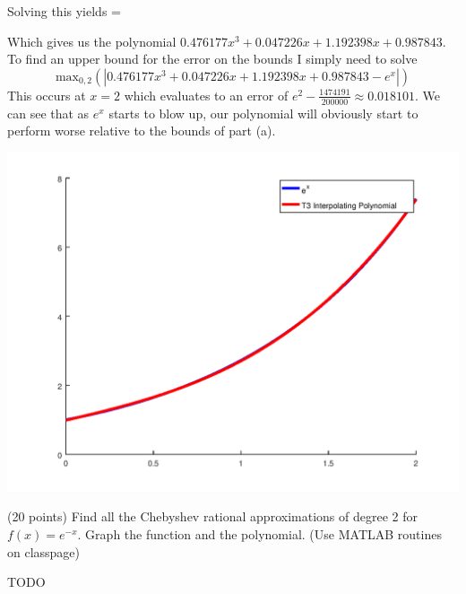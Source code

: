 \documentclass[10pt]{jhwhw}
\begin{document}
	\bigbreak
	Solving this yields
	\bigbreak
	\left[\begin{array}{c}
		a \\  b \\  c \\ d \\
	\end{array} \right] =
	\left[\begin{array}{c}
		0.476177 \\ 0.047226 \\ 1.192398 \\ 0.987843 \\
	\end{array} \right] \bigbreak

	\bigbreak
	Which gives us the polynomial $0.476177x^3 + 0.047226x + 1.192398x + 0.987843$.
	To find an upper bound for the error on the bounds I simply need to solve
	$$
		\text{max}_{0,2}(|0.476177x^3 + 0.047226x + 1.192398x + 0.987843 - e^x|)
	$$
	This occurs at $x=2$ which evaluates to an error of $e^2 - \frac{1474191}{200000} \approx 0.018101$.
	We can see that as $e^x$ starts to blow up, our polynomial will obviously start to perform worse
	relative to the bounds of part (a).

	\includegraphics[scale=0.75]{p3b}

\problem{} (20 points)
	Find all the Chebyshev rational approximations of degree 2 for $f(x) = e^{-x}$.
	Graph the function and the polynomial. (Use MATLAB routines on classpage)

\solution

	TODO
\end{document}
